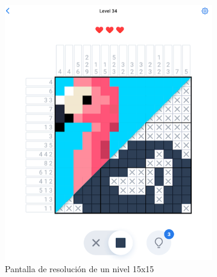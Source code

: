 \begin{figure}[h!]
   \centering
   \begin{subfigure}[b]{0.45\linewidth}
     \includegraphics[width=\linewidth]{images/picturecross1.png}
     \caption{Pantalla de resolución de un nivel 15x15}
     \label{fig:picture1-1}
   \end{subfigure}
   \begin{subfigure}[b]{0.45\linewidth}

\end{subfigure}
\end{figure}
